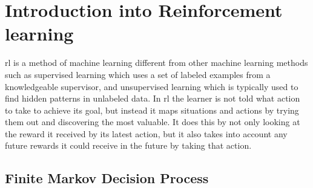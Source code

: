 \chapter{Introduction into Reinforcement learning}

\acrfull{rl} is a method of machine learning different from other machine learning methods such as supervised learning which uses a set of labeled examples from a knowledgeable supervisor, and unsupervised learning which is typically used to find hidden patterns in unlabeled data. In \gls{rl} the learner is not told what action to take to achieve its goal, but instead it maps situations and actions by trying them out and discovering the most valuable. It does this by not only looking at the reward it received by its latest action, but it also takes into account any future rewards it could receive in the future by taking that action.

\section{Finite Markov Decision Process}

